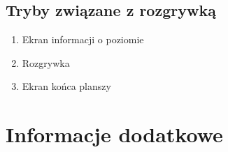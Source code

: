 \documentclass{article}
\begin{document}
    \subsection{Tryby związane z rozgrywką}
    \begin{enumerate}
        \item Ekran informacji o poziomie
        \item Rozgrywka
        \item Ekran końca planszy
        
    \end{enumerate}
        
    
    
    \newpage
    
\section{Informacje dodatkowe}
\end{document}
